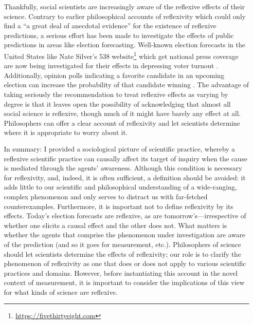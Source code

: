 Thankfully, social scientists are increasingly aware of the reflexive effects of their science. Contrary to earlier philosophical accounts of reflexivity which could only find a ``a great deal of anecdotal evidence'' \autocite[p487]{grunberg1986} for the existence of reflexive predictions, a serious effort has been made to investigate the effects of public predictions in areas like election forecasting. Well-known election forecasts in the United States like Nate Silver's 538 website\footnote{\url{https://fivethirtyeight.com}} which get national press coverage are now being investigated for their effects in depressing voter turnout \autocite{westwood2020}. Additionally, opinion polls indicating a favorite candidate in an upcoming election can increase the probability of that candidate winning \autocite{rothschild2014}. The advantage of taking seriously the recommendation to treat reflexive effects as varying by degree \autocite{lowe2018} is that it leaves open the possibility of acknowledging that almost all social science is reflexive, though much of it might have barely any effect at all. Philosophers can offer a clear account of reflexivity and let scientists determine where it is appropriate to worry about it.

In summary: I provided a sociological picture of scientific practice, whereby a reflexive scientific practice can causally affect its target of inquiry when the cause is mediated through the agents' awareness. Although this condition is necessary for reflexivity, and, indeed, it is often sufficient, a definition should be avoided: it adds little to our scientific and philosophical understanding of a wide-ranging, complex phenomenon and only serves to distract us with far-fetched counterexamples. Furthermore, it is important not to define reflexivity by its effects. Today's election forecasts are reflexive, as are tomorrow's---irrespective of whether one elicits a causal effect and the other does not. What matters is whether the agents that comprise the phenomenon under investigation are aware of the prediction (and so it goes for measurement, etc.). Philosophers of science should let scientists determine the effects of reflexivity; our role is to clarify the phenomenon of reflexivity as one that does or does not apply to various scientific practices and domains. However, before instantiating this account in the novel context of measurement, it is important to consider the implications of this view for what kinds of science are reflexive.




